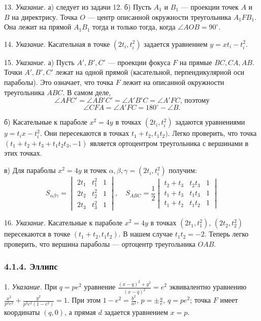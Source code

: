 13. \textit{Указание.} а) следует из задачи 12. б) Пусть $A_1$ и $B_1$ — проекции точек $A$ и $B$ на директрису. Точка $O$ — центр описанной окружности треугольника $A_1FB_1$. Она лежит на прямой $A_1B_1$ тогда и только тогда, когда $\angle AOB = 90^\circ$.

14. \textit{Указание.} Касательная в точке $(2t_i, t_i^2)$ задается уравнением $y = xt_i - t_i^2$.

15. \textit{Указание.} а) Пусть $A', B', C'$ — проекции фокуса $F$ на прямые $BC, CA, AB$. Точки $A', B', C'$ лежат на одной прямой (касательной, перпендикулярной оси параболы). Это означает, что точка $F$ лежит на описанной окружности треугольника $ABC$. В самом деле,
$$\angle AF C' = \angle AB'C' = \angle A'B'C = \angle A'FC\text{, поэтому}$$
$$\angle CFA = \angle A'FC = 180^\circ - \angle B.$$

б) Касательные к параболе $x^2 = 4y$ в точках $(2t_i, t_i^2)$ задаются уравнениями $y = t_ix - t_i^2$. Они пересекаются в точках $t_1 + t_2, t_1t_2)$. Легко проверить, что точка $(t_1+t_2+t_3 + t_1 t_2 t_3, -1)$ является ортоцентром треугольника с вершинами в этих точках.

в) Для параболы $x^2 = 4y$ и точек $\alpha, \beta, \gamma = (2t_i, t_i^2)$ получим:
\[S_{\alpha \beta \gamma} =
\begin{vmatrix} 
	2t_1 & t_1^2 & 1 \\
	2t_2 & t_2^2 & 1 \\
	2t_3 & t_3^2 & 1 
\end{vmatrix}, \quad S_{ABC} =
\frac{1}{2} \begin{vmatrix}
	t_2 + t_3 & t_2 t_3 & 1 \\
	t_1 + t_3 & t_1 t_3 & 1 \\
	t_1 + t_2 & t_1 t_2 & 1 
\end{vmatrix}
\]

16. \textit{Указание.} Касательные к параболе $x^2 = 4y$ в точках $(2t_1, t_1^2)$, $(2t_2, t_2^2)$ пересекаются в точке $(t_1+t_2, t_1 t_2)$. В нашем случае $t_1t_2 = -2$. Теперь легко проверить, что вершина параболы — ортоцентр треугольника $OAB$.

\subsubsection*{4.1.4. Эллипс}

1. \textit{Указание.} При $q = pe^2$ уравнение $\frac{(x - q)^2 + y^2}{(x - q)^2} = e^2$ эквивалентно уравнению $\frac{x^2}{p^2e^2} + \frac{y^2}{p^2 e^2(1 - e^2)} = 1$. При этом $1 - e^2 = \frac{b^2}{a^2}$, $p = \pm \frac{a}{e}$, $q = pe^2$; точка $F$ имеет координаты $(q, 0)$, а прямая $d$ задается уравнением $x = p$.

